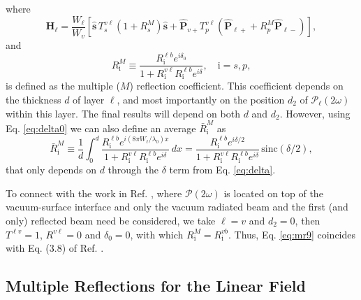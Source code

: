where
\begin{equation}\label{eq:mr9}
\mathbf{H}_{\ell}
= \frac{W_\ell}{W_v}
\left[
\hat{\mathbf{s}}\,T_{s}^{v\ell}
\left(1+ R^{M}_{s}\right)\hat{\mathbf{s}} + \hat{\mathbf{P}}_{v+}T_{p}^{v\ell}
\left(\hat{\mathbf{P}}_{\ell +} + R^{M}_{p}\hat{\mathbf{P}}_{\ell -}\right)
\right],
\end{equation}
and
\begin{equation}\label{m61}
R^{M}_{\mathrm{i}}\equiv
\frac{R^{\ell b}_{\mathrm{i}}e^{i\delta_{0}}}
     {1+R^{v\ell}_{\mathrm{i}} R^{\ell b}_{\mathrm{i}}e^{i\delta}},
     \quad \mathrm{i}=s,p,
\end{equation}
is defined as the multiple ($M$) reflection coefficient. This coefficient
depends on the thickness $d$ of layer $\ell$, and most importantly on the
position $d_{2}$ of $\boldsymbol{\mathcal{P}}_{\ell}(2\omega)$ within this
layer. The final results will depend on both $d$ and $d_{2}$. However, using Eq.
\eqref{eq:delta0} we can also define an average $\bar{R}^{M}_{\mathrm{i}}$ as
\begin{equation}\label{eq:mcave}
\bar{R}^{M}_{\mathrm{i}}\equiv 
\frac{1}{d}\int_{0}^{d}
\frac{R^{\ell b}_{\mathrm{i}}e^{i(8\pi W_{\ell}/\lambda_{0})x}}
{1 + R^{v\ell}_{\mathrm{i}}R^{\ell b}_{\mathrm{i}}e^{i\delta}}\,dx
= \frac{R^{\ell b}_{\mathrm{i}}e^{i\delta/2}}
{1 + R^{v\ell}_{\mathrm{i}}R^{\ell b}_{\mathrm{i}}e^{i\delta}}
\,\mathrm{sinc}(\delta/2),
\end{equation}
that only depends on $d$ through the $\delta$ term from Eq. \eqref{eq:delta}.

To connect with the work in Ref. \cite{mizrahiJOSA88}, where
$\boldsymbol{\mathcal{P}}(2\omega)$ is located on top of the vacuum-surface
interface and only the vacuum radiated beam and the first (and only) reflected
beam need be considered, we take $\ell = v$ and $d_{2} = 0$, then $T^{\ell v} =
1$, $R^{v\ell} = 0$ and $\delta_{0} = 0$, with which $R^{M}_{\mathrm{i}} =
R^{vb}_{\mathrm{i}}$. Thus, Eq. \eqref{eq:mr9} coincides with Eq. (3.8) of
Ref.
\cite{mizrahiJOSA88}.



\subsection{Multiple Reflections for the Linear Field}

